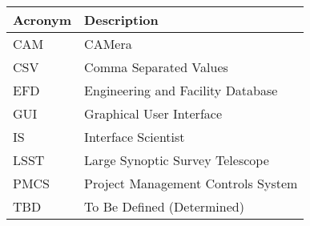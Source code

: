 \addtocounter{table}{-1}
\begin{longtable}{p{}p{}}\hline
\textbf{Acronym} & \textbf{Description}  \\\hline

CAM & CAMera \\\hline
CSV & Comma Separated Values \\\hline
EFD & Engineering and Facility Database \\\hline
GUI & Graphical User Interface \\\hline
IS & Interface Scientist \\\hline
LSST & Large Synoptic Survey Telescope \\\hline
PMCS & Project Management Controls System \\\hline
TBD & To Be Defined (Determined) \\\hline
\end{longtable}
